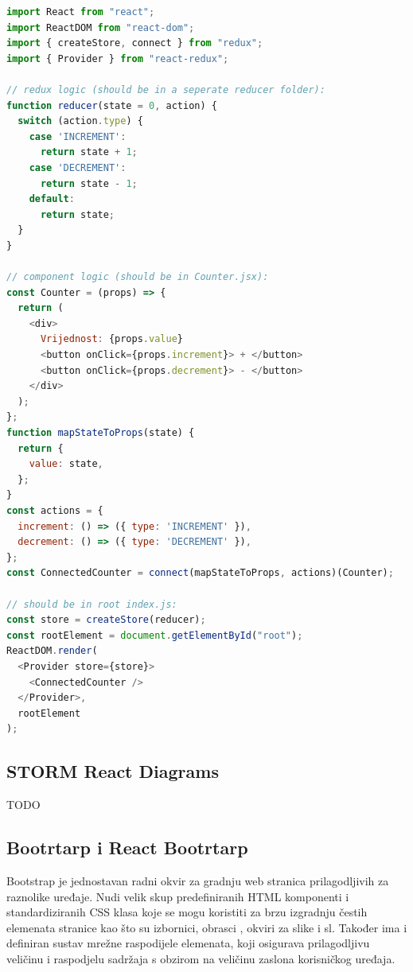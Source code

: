 \documentclass[times, utf8, diplomski, numeric]{fer}
\newcommand{\razmakp}{\vspace{18pt}}
\newcommand{\razmaks}{\vspace{10pt}}
\begin{document}
\razmakp %
\begin{lstlisting}[language=JavaScript, caption={Primjer korištenja Redux biblioteke u React aplikaciji}, label={lst:redux}]
import React from "react";
import ReactDOM from "react-dom";
import { createStore, connect } from "redux";
import { Provider } from "react-redux";

// redux logic (should be in a seperate reducer folder):
function reducer(state = 0, action) {
  switch (action.type) {
    case 'INCREMENT':
      return state + 1;
    case 'DECREMENT':
      return state - 1;
    default:
      return state;
  }
}

// component logic (should be in Counter.jsx):
const Counter = (props) => {
  return (
    <div>
      Vrijednost: {props.value}
      <button onClick={props.increment}> + </button>
      <button onClick={props.decrement}> - </button>
    </div>
  );
};
function mapStateToProps(state) {
  return {
    value: state,
  };
}
const actions = {
  increment: () => ({ type: 'INCREMENT' }),
  decrement: () => ({ type: 'DECREMENT' }),
};
const ConnectedCounter = connect(mapStateToProps, actions)(Counter);

// should be in root index.js:
const store = createStore(reducer);
const rootElement = document.getElementById("root");
ReactDOM.render(
  <Provider store={store}>
    <ConnectedCounter />
  </Provider>,
  rootElement
);
\end{lstlisting}
\razmaks


\subsection{STORM React Diagrams}

TODO


\subsection{Bootrtarp i React Bootrtarp}

Bootstrap je jednostavan radni okvir za gradnju web stranica prilagodljivih za raznolike uređaje.
Nudi velik skup predefiniranih HTML komponenti i standardiziranih CSS klasa koje se mogu koristiti za brzu izgradnju čestih elemenata stranice kao što su izbornici, obrasci , okviri za slike i sl.
Također ima i definiran sustav mrežne raspodijele elemenata, koji osigurava prilagodljivu veličinu i raspodjelu sadržaja s obzirom na veličinu zaslona korisničkog uređaja.
\end{document}
